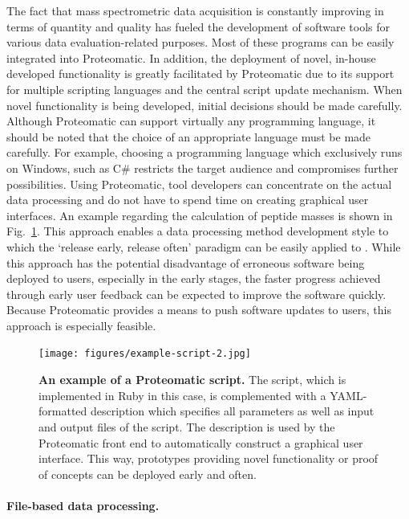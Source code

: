 The fact that mass spectrometric data acquisition is constantly improving in
terms of quantity and quality has fueled the development of software tools for
various data evaluation-related purposes.
Most of these programs can be easily integrated into Proteomatic.
In addition, the deployment of novel, in-house developed functionality is
greatly facilitated by Proteomatic due to its support for multiple scripting
languages and the central script update mechanism.
When novel functionality is being developed, initial decisions should be made 
carefully.
Although Proteomatic can support virtually any programming language, it should
be noted that the choice of an appropriate language must be made carefully.
For example, choosing a programming language which exclusively runs on Windows,
such as C\# restricts the target audience and compromises further possibilities.
Using Proteomatic, tool developers can concentrate on the actual data 
processing and do not have to spend time on creating graphical user interfaces.
An example regarding the calculation of peptide masses is shown in 
Fig.~\ref{fig:rapid-development}.
This approach enables a data processing method development style to which the
`release early, release often' paradigm can be easily applied to 
\citep{Raymond2001}.
While this approach has the potential disadvantage of erroneous software
being deployed to users, especially in the early stages, the faster progress
achieved through early user feedback can be expected to improve the software
quickly.
Because Proteomatic provides a means to push software updates to users,
this approach is especially feasible.

\begin{figure}
\texttt{[image: figures/example-script-2.jpg]}
\caption{
{\bf An example of a Proteomatic script.} 
The script, which is implemented in Ruby in this case, is complemented with
a YAML-formatted description which specifies all parameters as well as input
and output files of the script.
The description is used by the Proteomatic front end to automatically construct 
a graphical user interface. This way, prototypes providing novel functionality
or proof of concepts can be deployed early and often.
}
\label{fig:rapid-development}
\end{figure}

\paragraph{File-based data processing.}

